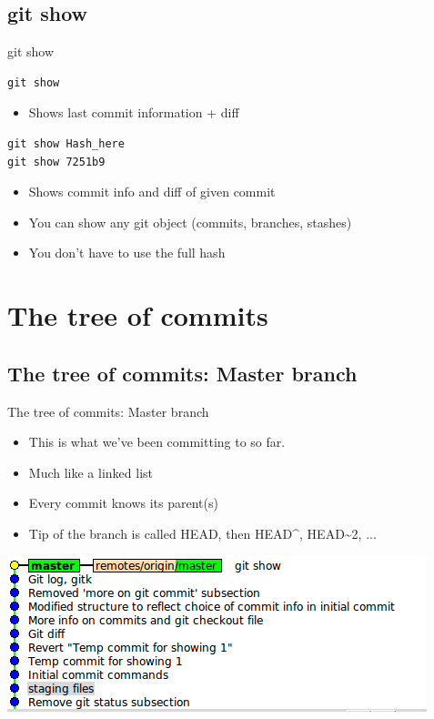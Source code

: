 \documentclass[10pt,a4paper]{beamer}
\begin{document}
\subsection{git show}
\begin{frame}[fragile]{git show}
\begin{verbatim}
git show
\end{verbatim}
\begin{itemize}
\item Shows last commit information + diff
\end{itemize}

\begin{verbatim}
git show Hash_here
git show 7251b9
\end{verbatim}
\begin{itemize}
\item Shows commit info and diff of given commit
\item You can show any git object (commits, branches, stashes)
\item You don't have to use the full hash
\end{itemize}
\end{frame}


\section{The tree of commits}

\subsection{The tree of commits: Master branch}
\begin{frame}{The tree of commits: Master branch}
\begin{itemize}
\item This is what we've been committing to so far.
\item Much like a linked list
\item Every commit knows its parent(s)
\item Tip of the branch is called HEAD, then HEAD\^{}, HEAD\~{}2, ...
\end{itemize}
\includegraphics[width=\linewidth]{masterbranch.png}
\end{frame}
\end{document}
